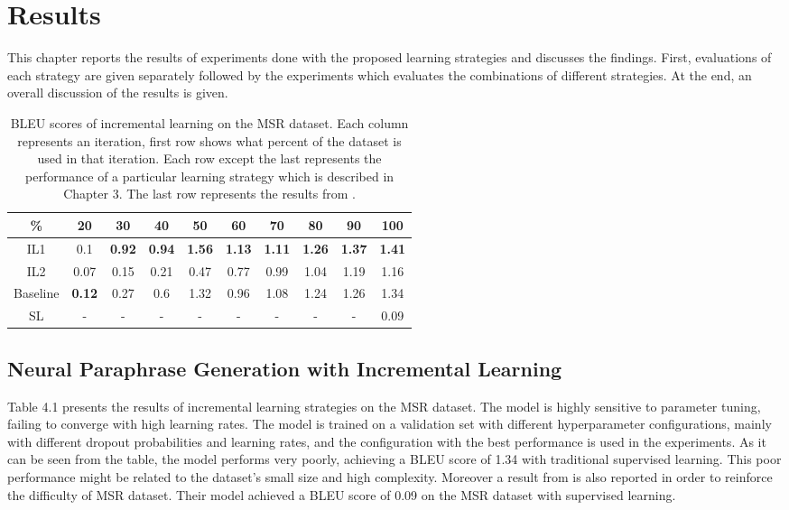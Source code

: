 \chapter{Results}\label{results}

This chapter reports the results of experiments done with the proposed learning strategies and discusses the findings. First, evaluations of each strategy are given separately followed by the experiments which evaluates the combinations of different strategies. At the end, an overall discussion of the results is given.

\begin{table}[t]
\centering
\small
 \begin{tabular}{|c | c | c | c | c | c | c | c | c | c |} 
 \hline
 \% & 20 & 30 & 40 & 50 & 60 & 70 & 80 & 90 & 100 \\ [0.5ex] 
 \hline
  IL1 & 0.1 &  \textbf{0.92} &  \textbf{0.94} &  \textbf{1.56} &  \textbf{1.13} &  \textbf{1.11} &  \textbf{1.26} &  \textbf{1.37} &  \textbf{1.41}  \\ 
 \hline
  IL2 & 0.07 & 0.15 & 0.21 & 0.47 & 0.77 & 0.99 & 1.04 & 1.19 & 1.16 \\ 
 \hline
 Baseline & \textbf{0.12} & 0.27 & 0.6 & 1.32 & 0.96 & 1.08 & 1.24 & 1.26 & 1.34 \\ 
 \hline
 SL & - & - & - & - & - & - & - & - & 0.09  \\ 
 \hline
\end{tabular}
\caption{BLEU scores of incremental learning on the MSR dataset. Each column represents an iteration, first row shows what percent of the dataset is used in that iteration. Each row except the last represents the performance of a particular learning strategy which is described in Chapter 3. The last row represents the results from \cite{brad}.}
\label{table:4.1}
\end{table}

\section{Neural Paraphrase Generation with Incremental Learning}

Table 4.1 presents the results of incremental learning strategies on the MSR dataset. The model is highly sensitive to parameter tuning, failing to converge with high learning rates. The model is trained on a validation set with different hyperparameter configurations, mainly with different dropout probabilities and learning rates, and the configuration with the best performance is used in the experiments. As it can be seen from the table, the model performs very poorly, achieving a BLEU score of 1.34 with traditional supervised learning. This poor performance might be related to the dataset's small size and high complexity. Moreover a result from \cite{brad} is also reported in order to reinforce the difficulty of MSR dataset. Their model achieved a BLEU score of 0.09 on the MSR dataset with supervised learning. 

